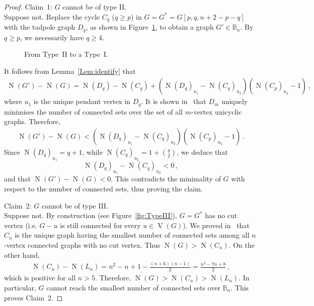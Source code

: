 \documentclass[a4paper,12pt]{amsart}
\theoremstyle{remark}
\DeclareMathOperator{\N}{N}
\DeclareMathOperator{\V}{V}
\begin{document}
\begin{proof}
{\sc Claim~1}: $G$ cannot be of type II.\\
Suppose not. Replace the cycle $C_q$ ($q\geq p$) in $G=G^*=G[p,q,n+2-p-q]$ with the tadpole graph $D_q$, as shown in Figure~\ref{fig:FromTypeII}, to obtain a graph $G'\in \mathbb{B}_n$. By $q\geq p$, we necessarily have $q\geq 4$.
\begin{figure}[h]
	\begin{center}
	\end{center}
	\caption{From Type~II to a Type~I.} \label{fig:FromTypeII}
\end{figure}
It follows from Lemma~\ref{Lem:identify} that
\begin{align*}
\N(G')-\N(G)=\N(D_q)-\N(C_q) + (\N(D_q)_{u_1} - \N(C_q)_{u_2} )(\N(C_p)_{u_2} -1 )\,,
\end{align*}
where $u_1$ is the unique pendant vertex in $D_q$. It is shown in~\cite{Audacegenral2018} that $D_m$ uniquely minimises the number of connected sets over the set of all $m$-vertex unicyclic graphs. Therefore,
\begin{align*}
\N(G')-\N(G) < (\N(D_q)_{u_1} - \N(C_q)_{u_2} )(\N(C_p)_{u_2} -1 )\,.
\end{align*}
Since $\N(D_q)_{u_1}=q+1$, while $\N(C_q)_{u_2}=1+\binom{q}{2}$, we deduce that
$$\N(D_q)_{u_1} - \N(C_q)_{u_2} < 0\,,$$
and that $\N(G')-\N(G) < 0$. This contradicts the minimality of $G$ with respect to the number of connected sets, thus proving the claim.

\medskip
{\sc Claim~2}: $G$ cannot be of type III.\\
Suppose not. By construction (see Figure~\ref{fig:TypeIII}), $G=G^*$ has no cut vertex (i.e. $G-u$ is still connected for every $u\in \V(G)$). We proved in~\cite{AudaceCut2019} that $C_n$ is the unique graph having the smallest number of connected sets among all $n$-vertex connected graphs with no cut vertex. Thus $\N(G) > \N(C_n)$. On the other hand, 
\begin{align*}
\N(C_n) - \N(L_n) = n^2-n+1 - \frac{(n+6)(n-1)}{2} = \frac{n^2 -7n +8}{2}\,,
\end{align*}
which is positive for all $n>5$. Therefore, $\N(G) > \N(C_n) > \N(L_n)$. In particular, $G$ cannot reach the smallest number of connected sets over $\mathbb{B}_n$. This proves Claim~2.


\end{proof}
\end{document}

